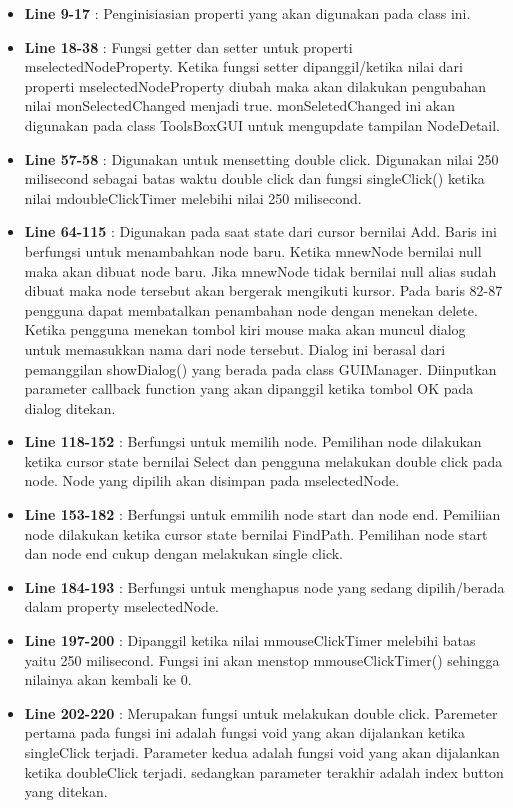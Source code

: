 \documentclass[12pt,a4paper,oneside]{article}
\begin{document}
\begin{itemize}
	\item \textbf{Line 9-17} : Penginisiasian properti yang akan digunakan pada class ini.
	\item \textbf{Line 18-38} : Fungsi getter dan setter untuk properti mselectedNodeProperty. Ketika fungsi setter dipanggil/ketika nilai dari properti mselectedNodeProperty diubah maka akan dilakukan pengubahan nilai monSelectedChanged menjadi true. monSeletedChanged ini akan digunakan pada class ToolsBoxGUI untuk mengupdate tampilan NodeDetail.
	\item \textbf{Line 57-58} : Digunakan untuk mensetting double click. Digunakan nilai 250 milisecond sebagai batas waktu double click dan fungsi singleClick() ketika nilai mdoubleClickTimer melebihi nilai 250 milisecond.
	\item \textbf{Line 64-115} : Digunakan pada saat state dari cursor bernilai Add. Baris ini berfungsi untuk menambahkan node baru. Ketika mnewNode bernilai null maka akan dibuat node baru. Jika mnewNode tidak bernilai null alias sudah dibuat maka node tersebut akan bergerak mengikuti kursor. Pada baris 82-87 pengguna dapat membatalkan penambahan node dengan menekan delete. Ketika pengguna menekan tombol kiri mouse maka akan muncul dialog untuk memasukkan nama dari node tersebut. Dialog ini berasal dari pemanggilan showDialog() yang berada pada class GUIManager. Diinputkan parameter callback function yang akan dipanggil ketika tombol OK pada dialog ditekan.
	\item \textbf{Line 118-152} : Berfungsi untuk memilih node. Pemilihan node dilakukan ketika cursor state bernilai Select dan pengguna melakukan double click pada node. Node yang dipilih akan disimpan pada mselectedNode.
	\item \textbf{Line 153-182} : Berfungsi untuk emmilih node start dan node end. Pemiliian node dilakukan ketika cursor state bernilai FindPath. Pemilihan node start dan node end cukup dengan melakukan single click.
	\item \textbf{Line 184-193} : Berfungsi untuk menghapus node yang sedang dipilih/berada dalam property mselectedNode.
	\item \textbf{Line 197-200} : Dipanggil ketika nilai mmouseClickTimer melebihi batas yaitu 250 milisecond. Fungsi ini akan menstop mmouseClickTimer() sehingga nilainya akan kembali ke 0.
	\item \textbf{Line 202-220} : Merupakan fungsi untuk melakukan double click. Paremeter pertama pada fungsi ini adalah fungsi void yang akan dijalankan ketika singleClick terjadi. Parameter kedua adalah fungsi void yang akan dijalankan ketika doubleClick terjadi. sedangkan parameter terakhir adalah index button yang ditekan.
\end{itemize}
\end{document}
